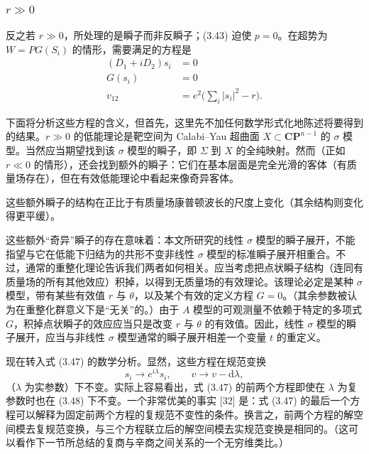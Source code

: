 \subsubsection*{$r\gg0$}

反之若 $r\gg0$，所处理的是瞬子而非反瞬子；(3.43) 迫使 $p=0$。在超势为 $W=PG(S_i)$ 的情形，需要满足的方程是
\begin{equation}
\begin{aligned}
(D_1+iD_2)s_i &= 0\\
G(s_i) &= 0\\
v_{12} &= e^2\Big(\sum_i|s_i|^2-r\Big).
\end{aligned}
\tag{3.47}
\end{equation}

下面将分析这些方程的含义，但首先，这里先不加任何数学形式化地陈述将要得到的结果。$r\gg0$ 的低能理论是靶空间为 Calabi--Yau 超曲面 $X\subset\mathbf{CP}^{n-1}$ 的 $\sigma$ 模型。当然应当期望找到该 $\sigma$ 模型的瞬子，即 $\Sigma$ 到 $X$ 的全纯映射。然而（正如 $r\ll0$ 的情形），还会找到额外的瞬子：它们在基本层面是完全光滑的客体（有质量场存在），但在有效低能理论中看起来像奇异客体。

\label{op:41}
这些额外瞬子的结构在正比于有质量场康普顿波长的尺度上变化（其余结构则变化得更平缓）。

这些额外“奇异”瞬子的存在意味着：本文所研究的线性 $\sigma$ 模型的瞬子展开，不能指望与它在低能下归结为的共形不变非线性 $\sigma$ 模型的标准瞬子展开相重合。不过，通常的重整化理论告诉我们两者如何相关。应当考虑把点状瞬子结构（连同有质量场的所有其他效应）积掉，以得到无质量场的有效理论。该理论必定是某种 $\sigma$ 模型，带有某些有效值 $r$ 与 $\theta$，以及某个有效的定义方程 $G=0$。（其余参数被认为在重整化群意义下是“无关”的。）由于 $A$ 模型的可观测量不依赖于特定的多项式 $G$，积掉点状瞬子的效应应当只是改变 $r$ 与 $\theta$ 的有效值。因此，线性 $\sigma$ 模型的瞬子展开，应当与非线性 $\sigma$ 模型通常的瞬子展开相差一个变量 $t$ 的重定义。

现在转入式 (3.47) 的数学分析。显然，这些方程在规范变换
\begin{equation}
s_i\to e^{i\lambda}s_i,\qquad v\to v-\mathrm{d}\lambda,
\tag{3.48}
\end{equation}
（$\lambda$ 为实参数）下不变。实际上容易看出，式 (3.47) 的前两个方程即使在 $\lambda$ 为复参数时也在 (3.48) 下不变。一个非常优美的事实 [32] 是：式 (3.47) 的最后一个方程可以解释为固定前两个方程的复规范不变性的条件。换言之，前两个方程的解空间模去复规范变换，与三个方程联立后的解空间模去实规范变换是相同的。（这可以看作下一节所总结的复商与辛商之间关系的一个无穷维类比。）


